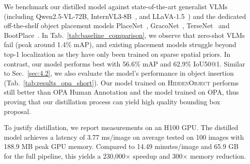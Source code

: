  We benchmark our distilled model against state-of-the-art generalist VLMs (including Qwen2.5-VL-72B\cite{bai2025qwen25vltechnicalreport}, InternVL3-8B~\cite{chen2024internvl}, and LLaVA-1.5~\cite{liu2024improved}) and the dedicated off-the-shelf object placement models PlaceNet~\cite{zhang2020learning}, GracoNet~\cite{zhou2022learning}, TerseNet~\cite{tripathi2019learning} and BootPlace~\cite{zhou2025bootplace}. In Tab.~\ref{tab:baseline_comparison}, we observe that zero-shot VLMs fail (peak around 1.4\% mAP), and existing placement models struggle beyond top-1 localization as they have only been trained on sparse spatial priors. In contrast, our model performs best with 56.6\% mAP and 62.9\% IoU50@1. 
Similar to Sec.~\ref{sec:4.2}, we also evaluate the model's performance in object insertion (Tab.~\ref{tab:results_opa_short}). 
Our model trained on \textsc{HiddenObject} performs still better than OPA Human Annotation and the model trained on OPA, thus proving that our distillation process can yield high quality bounding box proposal. 


 To justify distillation, we report measurements on an H100 GPU. The distilled model achieves a latency of 3.77 ms/image on average tested on 100 images with 188.9 MB peak GPU memory. Compared to 14.49 minutes/image and 65.9 GB for the full pipeline, this yields a 230,000$\times$ speedup and 300$\times$ memory reduction.



